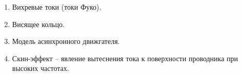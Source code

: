 	\begin{enumerate}
	\item Вихревые токи (токи Фуко).
	
	\item Висящее кольцо.
	
	\item Модель асинхронного движгателя.
	
	\item  Скин-эффект -- явление вытеснения тока к поверхности проводника при высоких частотах.
	\end{enumerate}

